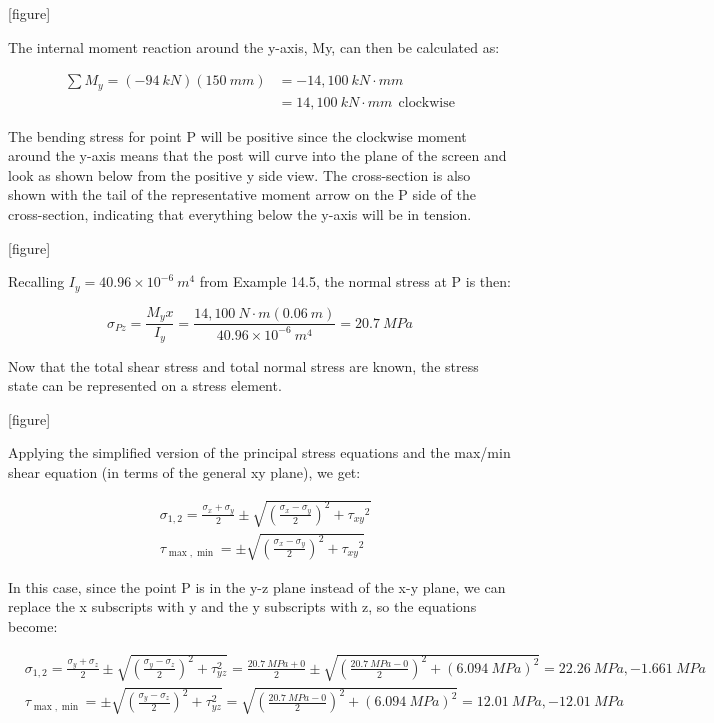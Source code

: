 \documentclass[
  letterpaper,
  DIV=11,
  numbers=noendperiod]{scrreprt}
\theoremstyle{definition}
\theoremstyle{remark}
\begin{document}
\begin{tcolorbox}
\begin{tcolorbox}
{[}figure{]}

The internal moment reaction around the y-axis, My, can then be
calculated as:

\[
\begin{aligned}
\sum M_y=(-94{~kN})(150{~mm})&=-14,100{~kN}\cdot{mm} \\
&=14,100{~kN}\cdot{mm}~~\text{clockwise}
\end{aligned}
\]

The bending stress for point P will be positive since the clockwise
moment around the y-axis means that the post will curve into the plane
of the screen and look as shown below from the positive y side view. The
cross-section is also shown with the tail of the representative moment
arrow on the P side of the cross-section, indicating that everything
below the y-axis will be in tension.

{[}figure{]}

Recalling \(I_y = 40.96 \times 10^{-6}{~m^4}\) from Example 14.5, the
normal stress at P is then:

\[
\sigma_{P z}=\frac{M_y x}{I_y}=\frac{14,100{~N}\cdot{m}(0.06{~m})}{40.96 \times 10^{-6}{~m^4}}=20.7{~MPa}
\]

Now that the total shear stress and total normal stress are known, the
stress state can be represented on a stress element.

{[}figure{]}

Applying the simplified version of the principal stress equations and
the max/min shear equation (in terms of the general xy plane), we get:

\[
\begin{aligned}
& \sigma_{1,2}=\frac{\sigma_x+\sigma_y}{2} \pm \sqrt{\left(\frac{\sigma_x-\sigma_y}{2}\right)^2+\tau_{x y}{ }^2} \\
& \tau_{\max , \min }= \pm \sqrt{\left(\frac{\sigma_x-\sigma_y}{2}\right)^2+\tau_{x y}{ }^2}
\end{aligned}
\]

In this case, since the point P is in the y-z plane instead of the x-y
plane, we can replace the x subscripts with y and the y subscripts with
z, so the equations become:

\[
\begin{aligned}
& \sigma_{1,2}=\frac{\sigma_y+\sigma_z}{2} \pm \sqrt{\left(\frac{\sigma_y-\sigma_z}{2}\right)^2+\tau_{y z}^2}=\frac{20.7{~MPa}+0}{2} \pm \sqrt{\left(\frac{20.7{~MPa}-0}{2}\right)^2+(6.094{~MPa})^2}=22.26{~MPa},-1.661{~MPa} \\
& \tau_{\max , \min }= \pm \sqrt{\left(\frac{\sigma_y-\sigma_z}{2}\right)^2+\tau_{y z}^2}=\sqrt{\left(\frac{20.7{~MPa}-0}{2}\right)^2+(6.094{~MPa})^2}=12.01{~MPa},-12.01{~MPa}
\end{aligned}
\]


\end{tcolorbox}
\end{tcolorbox}
\end{document}
